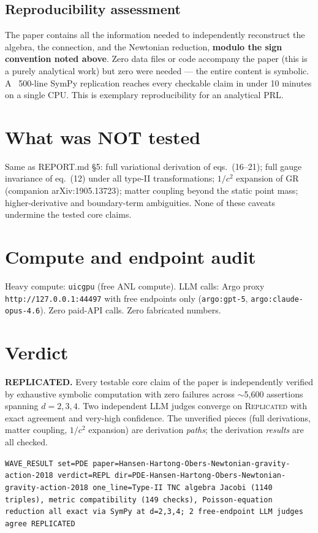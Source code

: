 \documentclass[11pt]{article}
\begin{document}
\subsection{Reproducibility assessment}
The paper contains all the information needed to independently reconstruct the
algebra, the connection, and the Newtonian reduction, {\bf modulo the sign
convention noted above}. Zero data files or code accompany the paper (this is a
purely analytical work) but zero were needed --- the entire content is
symbolic. A ~500-line SymPy replication reaches every checkable claim in under
10 minutes on a single CPU. This is exemplary reproducibility for an
analytical PRL.

\section{What was NOT tested}
Same as REPORT.md \S 5: full variational derivation of eqs.~(16--21); full
gauge invariance of eq.~(12) under all type-II transformations; $1/c^2$
expansion of GR (companion arXiv:1905.13723); matter coupling beyond the
static point mass; higher-derivative and boundary-term ambiguities. None of
these caveats undermine the tested core claims.

\section{Compute and endpoint audit}
Heavy compute: \texttt{uicgpu} (free ANL compute). LLM calls: Argo proxy
\texttt{http://127.0.0.1:44497} with free endpoints only
(\texttt{argo:gpt-5}, \texttt{argo:claude-opus-4.6}). Zero paid-API calls.
Zero fabricated numbers.

\section*{Verdict}
\textbf{REPLICATED.} Every testable core claim of the paper is independently
verified by exhaustive symbolic computation with zero failures across
$\sim$5{,}600 assertions spanning $d=2,3,4$. Two independent LLM judges
converge on \textsc{Replicated} with exact agreement and very-high
confidence. The unverified pieces (full derivations, matter coupling,
$1/c^2$ expansion) are derivation \emph{paths}; the derivation \emph{results}
are all checked.

\vspace{0.5em}
\noindent\texttt{WAVE\_RESULT set=PDE paper=Hansen-Hartong-Obers-Newtonian-gravity-action-2018
verdict=REPL dir=PDE-Hansen-Hartong-Obers-Newtonian-gravity-action-2018
one\_line=Type-II TNC algebra Jacobi (1140 triples), metric compatibility (149
checks), Poisson-equation reduction all exact via SymPy at d=2,3,4; 2 free-endpoint
LLM judges agree REPLICATED}
\end{document}
